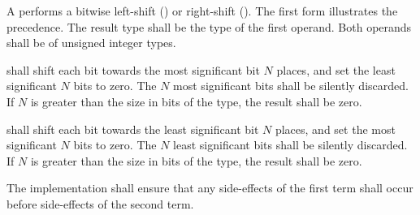 \specsubsubitem
A  performs a bitwise left-shift
(\terminal{\textless{}\textless{}}) or right-shift (\terminal{\textgreater{}\textgreater{}}). The first
form illustrates the precedence. The result type shall be the type of the first
operand. Both operands shall be of unsigned integer types.

\specsubsubitem
{} shall shift
each bit towards the most significant bit $N$ places, and set the least
significant $N$ bits to zero. The $N$ most significant bits shall be silently
discarded. If $N$ is greater than the size in bits of the type, the result shall
be zero.


\specsubsubitem
{} shall shift
each bit towards the least significant bit $N$ places, and set the most
significant $N$ bits to zero. The $N$ least significant bits shall be silently
discarded. If $N$ is greater than the size in bits of the type, the result shall
be zero.


\specsubsubitem
The implementation shall ensure that any side-effects of the first term shall
occur before side-effects of the second term.


\begin{grammar}
 \\
	 \\
	 \terminal{\&}  \\

 \\
	 \\
	 \terminal{\^}  \\

 \\
	 \\
	 \terminal{|}  \\
\end{grammar}

